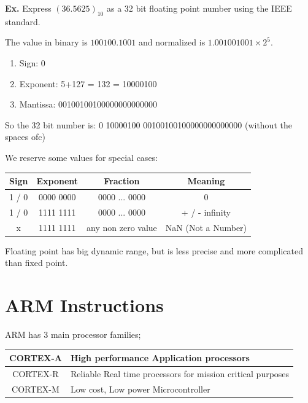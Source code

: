 \documentclass[12pt,letterpaper]{article} \usepackage{amsmath} \usepackage{graphicx} \usepackage[margin=1in]{geometry} \usepackage{longtable}  \usepackage{amssymb}
\begin{document}
	\begin{mdframed}[]
		\textbf{Ex. } Express $(36.5625)_{10}$ as a 32 bit floating point number using the IEEE standard.
		
		The value in binary is $100100.1001$ and normalized is $1.001001001 \times 2^5$.
		
		\begin{enumerate}[noitemsep]
			\item Sign: 0
			\item Exponent: 5+127 = 132 = 10000100 
			\item Mantissa: 00100100100000000000000
		\end{enumerate}
		
		So the 32 bit number is: 0 10000100 00100100100000000000000 (without the spaces ofc)
	\end{mdframed}
	
	We reserve some values for special cases:
	\begin{center}
		\begin{tabular}{|c|c|c||c|}
			\hline
			Sign & Exponent & Fraction & Meaning \\
			\hline\hline
			1 / 0 & 0000 0000 & 0000 ... 0000 & 0 \\
			\hline
			1 / 0 & 1111 1111 & 0000 ... 0000 & + / - infinity \\
			\hline
			x & 1111 1111  & any non zero value & NaN (Not a Number) \\
			\hline
		\end{tabular}
	\end{center}
	
	Floating point has big dynamic range, but is less precise and more complicated than fixed point. 
	
	\section{ARM Instructions}
	ARM has 3 main processor families;
	\begin{center}
		\begin{tabular}{|c|l|}
			\hline
			CORTEX-A & High performance Application processors \\
			\hline
			CORTEX-R & Reliable Real time processors for mission critical purposes \\
			\hline
			CORTEX-M & Low cost, Low power Microcontroller \\
			\hline
		\end{tabular}
	\end{center}
	
\end{document}
